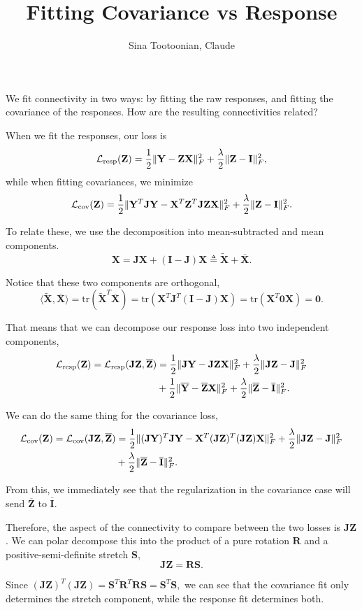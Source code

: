 \documentclass[10pt]{article}
\newcommand{\ol}[1]{\overline{#1}}
\newcommand{\loss}[1]{\mathcal{L}_\text{#1}}
\newcommand{\bzero}{\mathbf{0}}
\newcommand{\frob}[1]{\|#1\|_F^2}
\newcommand{\wt}[1]{\widetilde{#1}}
\newcommand{\XX}{\mathbf{X}}
\newcommand{\ZZ}{\mathbf{Z}}
\newcommand{\JJ}{\mathbf{J}}
\newcommand{\II}{\mathbf{I}}
\newcommand{\la}{\lambda}
\newcommand{\YY}{\mathbf{Y}}
\newcommand{\RR}{\mathbf{R}}
\renewcommand{\SS}{\mathbf{S}}
\newcommand{\tr}{\text{tr}}
\begin{document}
\title{Fitting Covariance vs Response}
\author{
  Sina Tootoonian, Claude 
}
\maketitle{}
We fit connectivity in two ways: by fitting the raw responses, and fitting the covariance of the responses. How are the resulting connectivities related?

When we fit the responses, our loss is $$ \loss{resp}(\ZZ) = \half \frob{\YY - \ZZ \XX} + \half{\la}\frob{\ZZ - \II},$$ while when fitting covariances, we minimize $$ \loss{cov}(\ZZ) = \half \frob{ \YY^T \JJ \YY - \XX^T \ZZ^T \JJ \ZZ \XX }  + \half{\la} \frob{\ZZ - \II}.$$

To relate these, we use the decomposition into mean-subtracted and mean components.
$$ \XX = \JJ \XX + (\II - \JJ)\XX \triangleq \wt{\XX} + \ol{\XX}.$$

Notice that these two components are orthogonal,
$$ \langle \wt{\XX}, \ol{\XX} \rangle = \tr(\wt{\XX}^T \ol{\XX}) = \tr(\XX^T \JJ^T (\II - \JJ) \XX )=\tr(\XX^T \bzero \XX) = \bzero.$$

That means that we can decompose our response loss into two independent components,\begin{align*} \loss{resp}(\ZZ) = \loss{resp}(\JJ \ZZ, \ol{\ZZ})&= \half \frob{ \JJ \YY  - \JJ \ZZ \XX} + \half{\la}\frob{\JJ \ZZ - \JJ}\\ &+ \half \frob{\ol{\YY} - \ol{\ZZ}\XX} +  \half{\la}\frob{\ol{\ZZ} - \ol{\II}}.
\end{align*}

We can do the same thing for the covariance loss,
\begin{align*}
  \loss{cov}(\ZZ) = \loss{cov}(\JJ \ZZ, \ol{\ZZ}) &= \half\frob{(\JJ \YY)^T \JJ \YY - \XX^T (\JJ \ZZ)^T (\JJ \ZZ) \XX} + \half{\la}\frob{\JJ \ZZ -\JJ} \\ & + \half{\la}\frob{\ol{\ZZ} - \ol{\II}}.
\end{align*}

From this, we immediately see that the regularization in the covariance case will send $\ol{\ZZ}$ to $\ol{\II}$.

Therefore, the aspect of the connectivity to compare between the two losses is $\JJ \ZZ$. We can polar decompose this into the product of a pure rotation $\RR$ and a positive-semi-definite stretch $\SS$, $$ \JJ \ZZ = \RR \SS.$$

Since $(\JJ \ZZ)^T (\JJ \ZZ) = \SS^T \RR^T \RR \SS = \SS^T \SS,$ we can see that the covariance fit only determines the stretch component, while the response fit determines both.
\end{document}
